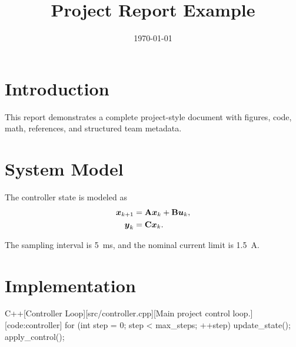 \documentclass[titlepage=formal,code=listings]{../SUSTechHomework}
\title{Project Report Example}
\date{\today}
\begin{document}
\clearauthors
{}

\clearcontributions
{}

\clearcredits
{}

\maketitle
\tableofcontents

\section{Introduction}

This report demonstrates a complete project-style document with figures, code,
math, references, and structured team metadata.

\section{System Model}

The controller state is modeled as
\begin{align}
  \boldsymbol{x}_{k+1} &= \mathbf{A}\boldsymbol{x}_k + \mathbf{B}\boldsymbol{u}_k, \\
  \boldsymbol{y}_k &= \mathbf{C}\boldsymbol{x}_k.
\end{align}

The sampling interval is \qty{5}{\milli\second}, and the nominal current limit
is \qty{1.5}{\ampere}.

\section{Implementation}

\begin{sustechcodeblock}{C++}[Controller Loop][src/controller.cpp][Main project control loop.][code:controller]
for (int step = 0; step < max_steps; ++step) {
    update_state();
    apply_control();
}
\end{sustechcodeblock}
\end{document}
